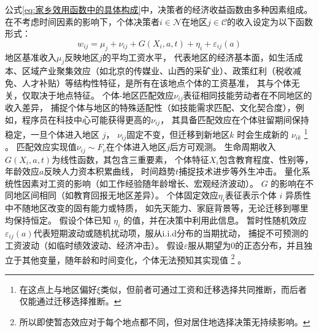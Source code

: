 \documentclass[a4paper, zihao=-4, fontset = mac, oneside]{ctexbook} %
\let\oldfootnote\footnote
\renewcommand{\footnote}[1]{%
  \oldfootnote{\setstretch{1.5}#1}%
}
\begin{document}
公式\ref{eq:家乡效用函数中的具体构成}中，决策者的经济收益函数由多种因素组成。在不考虑时间因素的影响下，个体决策者$i \in \mathcal{N}$在地区$j \in \mathcal{C}$的收入设定为以下函数形式：
\begin{equation}
  w_{ij}=\mu_j + \nu_{ij} + G(X_i,a,t) + \eta_i + \varepsilon_{ij}(a)
  \label{eq:经济收益函数}
\end{equation}
地区基准收入$\mu_j$反映地区$j$的平均工资水平，
代表地区的经济基本面，如生活成本、区域产业聚集效应（如北京的传媒业、山西的采矿业）、政策红利（税收减免、人才补贴）等结构性特征，是所有在该地点个体的工资基准，
其与个体无关，仅取决于地点特征。
个体-地区匹配效应$\nu_{ij}$表征相同技能劳动者在不同地区的收入差异，
捕捉个体与地区的特殊适配性（如技能需求匹配、文化契合度），例如，程序员在科技中心可能获得更高的$\nu_{ij}$，
其具备匹配效应在个体驻留期间保持稳定，一旦个体进入地区 $j$，
$\nu_{ij}$固定不变，但迁移到新地区$k$ 时会生成新的 $\nu_{ik}$\footnote{在这点上与地区偏好$\xi$类似，但前者可通过工资和迁移选择共同推断，而后者仅能通过迁移选择推断。}。
匹配效应实现值$\nu_{ij} \sim F_\nu$在个体进入地区$j$后方可观测。
生命周期收入$G(X_i,a,t)$为线性函数，其包含三重要素，
个体特征$X_i$包含教育程度、性别等，
年龄效应$a$反映人力资本积累曲线，
时间趋势$t$捕捉技术进步等外生冲击。
量化系统性因素对工资的影响（如工作经验随年龄增长、宏观经济波动）。
$G$ 的影响在不同地区间相同（如教育回报无地区差异）。
个体固定效应$\eta_i$表征表示个体 $i$ 异质性中不随地区改变的固有能力或特质，
如先天能力、家庭背景等，无论迁移到哪里均保持恒定。
假设个体已知 $\eta_i$ 的值，并在决策中利用此信息。
暂时性随机效应$\varepsilon_{ij}(a)$代表短期波动或随机扰动项，服从i.i.d分布的当期扰动，
捕捉不可预测的工资波动（如临时绩效波动、经济冲击）。
假设$\varepsilon$服从期望为0的正态分布，并且独立于其他变量，随年龄和时间变化，个体无法预知其实现值\footnote{所以即使暂态效应对于每个地点都不同，但对居住地选择决策无持续影响。}。
\end{document}
